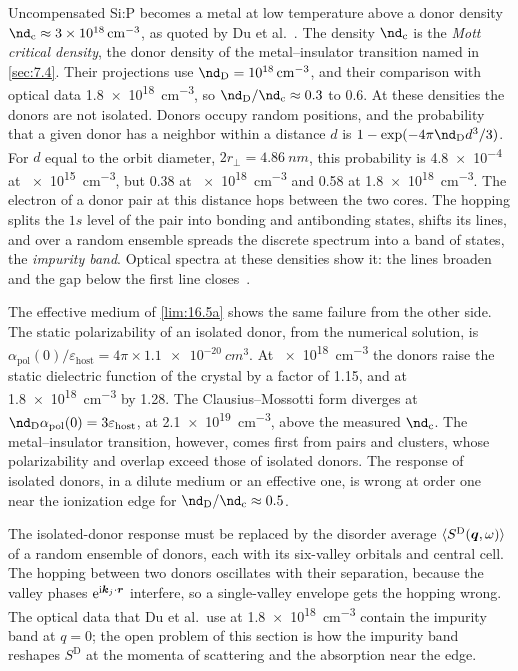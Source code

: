 Uncompensated Si:P becomes a metal at low temperature above a donor density $\nd_{\mathrm{c}} \approx \SI{3e18}{cm^{-3}}$, as quoted by Du et al.~\cite[Sect.~II]{du2022doped}. The density $\nd_{\mathrm{c}}$ is the \emph{Mott critical density}, the donor density of the metal--insulator transition named in \cref{sec:7.4}. Their projections use $\nd_{\mathrm{D}} = \SI{e18}{cm^{-3}}$, and their comparison with optical data \SI{1.8e18}{cm^{-3}}, so $\nd_{\mathrm{D}}/\nd_{\mathrm{c}} \approx 0.3$ to 0.6. At these densities the donors are not isolated. Donors occupy random positions, and the probability that a given donor has a neighbor within a distance $d$ is $1 - \exp(-4\pi\nd_{\mathrm{D}}d^3/3)$. For $d$ equal to the orbit diameter, $2r_\perp = \SI{4.86}{nm}$, this probability is \num{4.8e-4} at \SI{e15}{cm^{-3}}, but 0.38 at \SI{e18}{cm^{-3}} and 0.58 at \SI{1.8e18}{cm^{-3}}. The electron of a donor pair at this distance hops between the two cores. The hopping splits the $1s$ level of the pair into bonding and antibonding states, shifts its lines, and over a random ensemble spreads the discrete spectrum into a band of states, the \emph{impurity band}. Optical spectra at these densities show it: the lines broaden and the gap below the first line closes~\cite[Sect.~VII.6]{du2022doped}.

The effective medium of \cref{lim:16.5a} shows the same failure from the other side. The static polarizability of an isolated donor, from the numerical solution, is $\alpha_{\mathrm{pol}}(0)/\varepsilon_{\mathrm{host}} = 4\pi\times\SI{1.1e-20}{cm^3}$. At \SI{e18}{cm^{-3}} the donors raise the static dielectric function of the crystal by a factor of 1.15, and at \SI{1.8e18}{cm^{-3}} by 1.28. The Clausius--Mossotti form diverges at $\nd_{\mathrm{D}}\alpha_{\mathrm{pol}}(0) = 3\varepsilon_{\mathrm{host}}$, at \SI{2.1e19}{cm^{-3}}, above the measured $\nd_{\mathrm{c}}$. The metal--insulator transition, however, comes first from pairs and clusters, whose polarizability and overlap exceed those of isolated donors. The response of isolated donors, in a dilute medium or an effective one, is wrong at order one near the ionization edge for $\nd_{\mathrm{D}}/\nd_{\mathrm{c}} \approx 0.5$.

The isolated-donor response must be replaced by the disorder average $\langle S^{\mathrm{D}}(\bm{q},\omega)\rangle$ of a random ensemble of donors, each with its six-valley orbitals and central cell. The hopping between two donors oscillates with their separation, because the valley phases $\mathrm{e}^{\mathrm{i}\bm{k}_j\cdot\bm{r}}$ interfere, so a single-valley envelope gets the hopping wrong. The optical data that Du et al.\ use at \SI{1.8e18}{cm^{-3}} contain the impurity band at $q = 0$; the open problem of this section is how the impurity band reshapes $S^{\mathrm{D}}$ at the momenta of scattering and the absorption near the edge.

